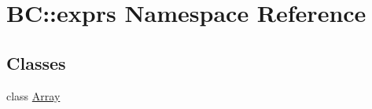 \hypertarget{namespaceBC_1_1exprs}{}\section{BC\+:\+:exprs Namespace Reference}
\label{namespaceBC_1_1exprs}
\subsection*{Classes}
\begin{DoxyCompactItemize}
\item 
class \hyperlink{classBC_1_1exprs_1_1Array}{Array}
\end{DoxyCompactItemize}
